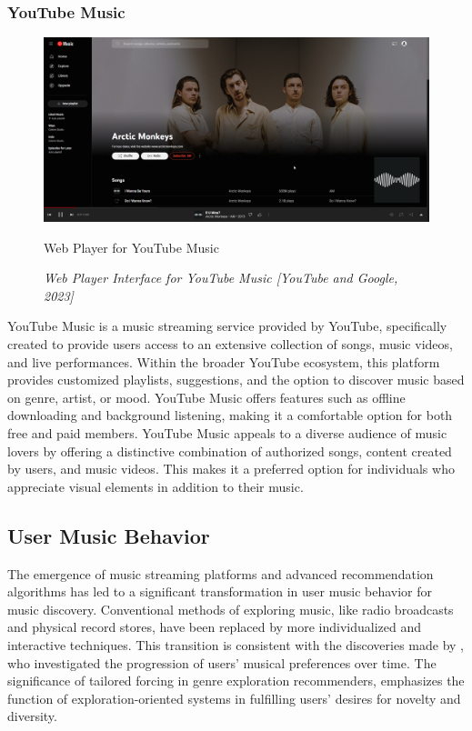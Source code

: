 \subsubsection{YouTube Music}
\begin{figure}[h]
    \centering
    \includegraphics[width=1.0\linewidth]{mainmatter/images/musicplat3.png}
    \caption{Web Player for YouTube Music}
    \caption*{\textit{Web Player Interface for YouTube Music [YouTube and Google, 2023]}}
    \label{fig:myfig8}
\end{figure}
YouTube Music is a music streaming service provided by YouTube, specifically created to provide users access to an extensive collection of songs, music videos, and live performances. Within the broader YouTube ecosystem, this platform provides customized playlists, suggestions, and the option to discover music based on genre, artist, or mood. YouTube Music offers features such as offline downloading and background listening, making it a comfortable option for both free and paid members. YouTube Music appeals to a diverse audience of music lovers by offering a distinctive combination of authorized songs, content created by users, and music videos. This makes it a preferred option for individuals who appreciate visual elements in addition to their music. \pagebreak

\subsection{User Music Behavior}
The emergence of music streaming platforms and advanced recommendation algorithms has led to a significant transformation in user music behavior for music discovery. Conventional methods of exploring music, like radio broadcasts and physical record stores, have been replaced by more individualized and interactive techniques. This transition is consistent with the discoveries made by \textcite{liang22}, who investigated the progression of users' musical preferences over time. The significance of tailored forcing in genre exploration recommenders, emphasizes the function of exploration-oriented systems in fulfilling users' desires for novelty and diversity. \\

